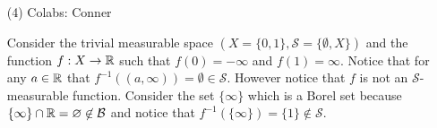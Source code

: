 \documentclass[12pt]{amsart}
\begin{document}
\begin{itemize}
    \item[(4)] Colabs: Conner
    
    Consider the trivial measurable space $(X=\{0,1\}, \mathcal{S}=\{\emptyset, X\})$ and the function 
    $f:X\rightarrow \mathbb{R}$ such that $f(0)=-\infty$ and $f(1)=\infty$. Notice that for any $a\in\mathbb{R}$ that
    $f^{-1}((a,\infty))=\emptyset\in\mathcal S$. However notice that $f$ is not an $\mathcal S$-measurable function.
    Consider the set $\{\infty\}$ which is a Borel set because $\{\infty\}\cap \mathbb{R}=\varnothing\not\in\mathcal B$ and
    notice that $f^{-1}(\{\infty\})=\{1\}\not\in \mathcal S$.
    
\end{itemize}
\end{document}
